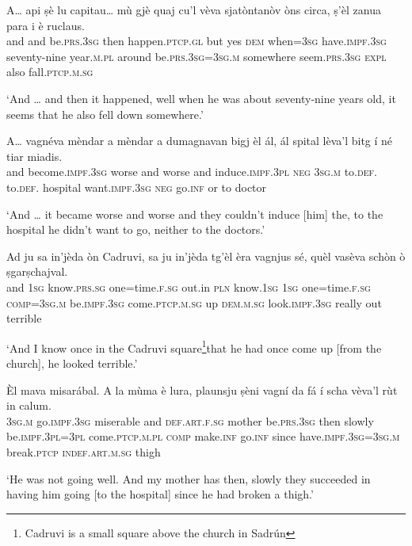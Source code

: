 \begin{linenumbers}
\gll  A… api ṣè lu capitau… mù gjè quaj cu’l vèva sjatòntanòv òns circa, ṣ’èl zanua para i è ruclaus.  \\
and and  be.\textsc{prs.3sg} then happen.\textsc{ptcp.gl} but yes \textsc{dem} when=\textsc{3sg} have.\textsc{impf.3sg} seventy-nine year.\textsc{m.pl} around be.\textsc{prs.3sg=3sg.m} somewhere  seem.\textsc{prs.3sg} \textsc{expl} also fall.\textsc{ptcp.m.sg}\\
\end{linenumbers}
\medskip
\glt `And … and then it happened, well when he was about seventy-nine years old, it seems that he also fell down somewhere.'
\medskip

\begin{linenumbers}
\gll  A… vagnéva mèndar a mèndar a dumagnavan bigj èl ál, ál spital lèva’l bitg í né tiar miadis.  \\
and become.\textsc{impf.3sg} worse and worse and  induce.\textsc{impf.3pl} \textsc{neg} \textsc{3sg.m} to.\textsc{def.} to.\textsc{def.} hospital want.\textsc{impf.3sg} \textsc{neg}  go.\textsc{inf} or to doctor \\
\end{linenumbers}
\medskip
\glt `And … it became worse and worse and they couldn’t induce [him] the, to the hospital he didn’t want to go, neither to the doctors.'
\medskip

\begin{linenumbers}
\gll  Ad ju sa in'jèda òn Cadruvi, sa ju in'jèda tg’èl èra vagnjus sé, quèl vasèva schòn ò ṣgarṣchajval.  \\
and \textsc{1sg} know.\textsc{prs.sg} one=time.\textsc{f.sg} out.in \textsc{pln} know.\textsc{1sg}  \textsc{1sg} one=time.\textsc{f.sg} \textsc{comp=3sg.m} be.\textsc{impf.3sg} come.\textsc{ptcp.m.sg} up \textsc{dem.m.sg} look.\textsc{impf.3sg} really out terrible  \\
\end{linenumbers}
\medskip
\glt `And I know once in the Cadruvi square\footnote{Cadruvi is a small square above the church in Sadrún}that he had once come up [from the church], he looked terrible.'

\begin{linenumbers}
\gll   Èl mava misarábal. A la mùma è lura, plaunsju ṣèni vagní da fá í scha vèva’l rùt in calum.\\
 \textsc{3sg.m} go.\textsc{impf.3sg} miserable and \textsc{def.art.f.sg} mother  be.\textsc{prs.3sg} then slowly be.\textsc{impf.3pl=3pl} come.\textsc{ptcp.m.pl} \textsc{comp} make.\textsc{inf} go.\textsc{inf} since have.\textsc{impf.3sg=3sg.m} break.\textsc{ptcp} \textsc{indef.art.m.sg} thigh \\
\end{linenumbers}
\medskip
\glt `He was not going well. And my mother has then, slowly they succeeded in having him going [to the hospital] since he had broken a thigh.'
\medskip

